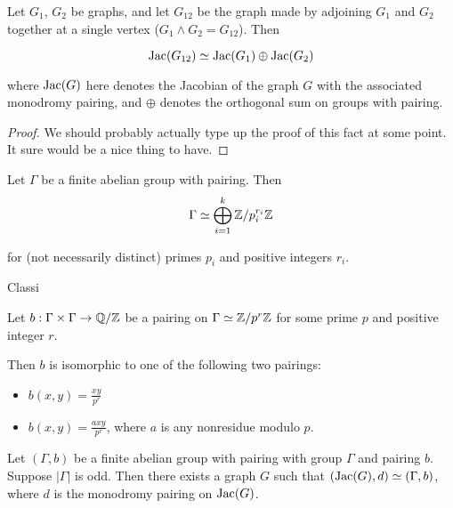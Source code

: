 \documentclass{article}
\begin{document}
\begin{prop}
\label{wedge_product}
Let $G_1$, $G_2$ be graphs, and let $G_{12}$ be the graph made by
adjoining $G_1$ and $G_2$ together at a single vertex ($G_1 \wedge G_2
= G_{12}$). Then

  $$\operatorname{Jac}(G_{12}) \simeq \operatorname{Jac}(G_1) \oplus \operatorname{Jac}(G_2)$$

  where $\operatorname{Jac}(G)$ here denotes the Jacobian of the graph $G$ with the
  associated monodromy pairing, and $\oplus$ denotes the orthogonal sum
  on groups with pairing.
\end{prop}

\begin{proof} We should probably actually type up the proof of this
  fact at some point. It sure would be a nice thing to have.
\end{proof}

\begin{thm}
  Let $\Gamma$ be a finite abelian group with pairing. Then
  \begin{equation}
    \Gamma \simeq \bigoplus_{i=1}^k \mathbb{Z}/p_i^{r_i}\mathbb{Z}
  \end{equation}

  for (not necessarily distinct) primes $p_i$ and positive integers
  $r_i$. 
\end{thm}

Classi

\begin{thm}
  Let $b:\Gamma \times \Gamma \to \mathbb{Q}/\mathbb{Z}$ be a pairing on $\Gamma
  \simeq \mathbb{Z}/p^r\mathbb{Z}$ for some prime $p$ and positive integer $r$. 

  Then $b$ is isomorphic to one of the following two pairings:
  
  \begin{itemize}
    \item $b(x,y) = \frac{xy}{p^r}$
    \item $b(x,y) = \frac{axy}{p^r}$, where $a$ is any nonresidue
      modulo $p$.
  \end{itemize}
\end{thm}

\begin{thm}
  Let $(\Gamma, b)$ be a finite abelian group with pairing with group
  $\Gamma$ and pairing $b$. Suppose $|\Gamma|$ is odd. Then there
  exists a graph $G$ such that $(\operatorname{Jac}(G), d) \simeq (\Gamma, b)$,
  where $d$ is the monodromy pairing on $\operatorname{Jac}(G)$. 
\end{thm}
\end{document}
